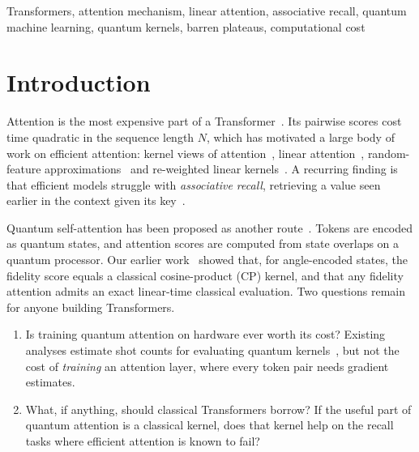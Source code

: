 \documentclass[conference]{IEEEtran}
\theoremstyle{definition}
\begin{document}
\begin{IEEEkeywords}
Transformers, attention mechanism, linear attention, associative recall, quantum machine learning, quantum kernels, barren plateaus, computational cost
\end{IEEEkeywords}

\section{Introduction}

Attention is the most expensive part of a Transformer~\cite{vaswani2017attention}. Its pairwise scores cost time quadratic in the sequence length $N$, which has motivated a large body of work on efficient attention: kernel views of attention~\cite{tsai2019dissection}, linear attention~\cite{katharopoulos2020linear}, random-feature approximations~\cite{choromanski2021performer} and re-weighted linear kernels~\cite{qin2022cosformer}. A recurring finding is that efficient models struggle with \emph{associative recall}, retrieving a value seen earlier in the context given its key~\cite{arora2024zoology,arora2024based}.

Quantum self-attention has been proposed as another route~\cite{li2024qsann,zhao2024qksan,chen2024qmsan,pecilli2026overlap,xu2026higher,zhang2025survey}. Tokens are encoded as quantum states, and attention scores are computed from state overlaps on a quantum processor. Our earlier work~\cite{singuru2026fidelity} showed that, for angle-encoded states, the fidelity score equals a classical cosine-product (CP) kernel, and that any fidelity attention admits an exact linear-time classical evaluation. Two questions remain for anyone building Transformers.

\begin{enumerate}
  \item Is training quantum attention on hardware ever worth its cost? Existing analyses estimate shot counts for evaluating quantum kernels~\cite{miroszewski2024shots,thanasilp2024concentration}, but not the cost of \emph{training} an attention layer, where every token pair needs gradient estimates.
  \item What, if anything, should classical Transformers borrow? If the useful part of quantum attention is a classical kernel, does that kernel help on the recall tasks where efficient attention is known to fail?
\end{enumerate}
\end{document}
